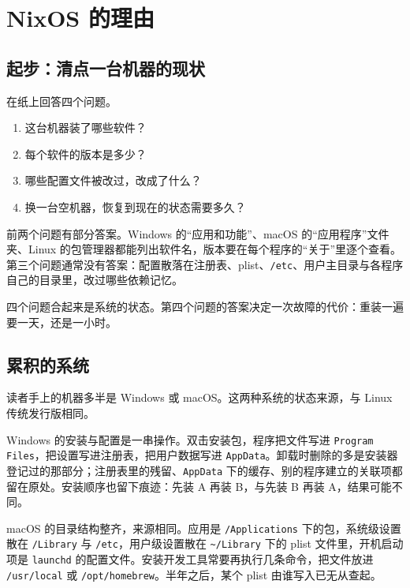 \chapter{NixOS 的理由}
\label{ch:why-nixos}

\section{起步：清点一台机器的现状}

在纸上回答四个问题。

\begin{enumerate}
  \item 这台机器装了哪些软件？
  \item 每个软件的版本是多少？
  \item 哪些配置文件被改过，改成了什么？
  \item 换一台空机器，恢复到现在的状态需要多久？
\end{enumerate}

前两个问题有部分答案。Windows 的“应用和功能”、macOS 的“应用程序”文件夹、Linux 的包管理器都能列出软件名，版本要在每个程序的“关于”里逐个查看。第三个问题通常没有答案：配置散落在注册表、plist、\texttt{/etc}、用户主目录与各程序自己的目录里，改过哪些依赖记忆。

四个问题合起来是系统的状态。第四个问题的答案决定一次故障的代价：重装一遍要一天，还是一小时。

\section{累积的系统}

读者手上的机器多半是 Windows 或 macOS。这两种系统的状态来源，与 Linux 传统发行版相同。

Windows 的安装与配置是一串操作。双击安装包，程序把文件写进 \texttt{Program Files}，把设置写进注册表，把用户数据写进 \texttt{AppData}。卸载时删除的多是安装器登记过的那部分；注册表里的残留、\texttt{AppData} 下的缓存、别的程序建立的关联项都留在原处。安装顺序也留下痕迹：先装 A 再装 B，与先装 B 再装 A，结果可能不同。

macOS 的目录结构整齐，来源相同。应用是 \texttt{/Applications} 下的包，系统级设置散在 \texttt{/Library} 与 \texttt{/etc}，用户级设置散在 \texttt{\textasciitilde/Library} 下的 plist 文件里，开机启动项是 \texttt{launchd} 的配置文件。安装开发工具常要再执行几条命令，把文件放进 \texttt{/usr/local} 或 \texttt{/opt/homebrew}。半年之后，某个 plist 由谁写入已无从查起。

